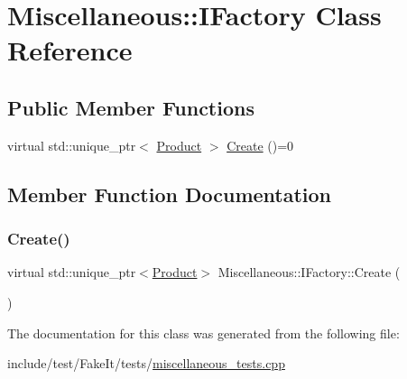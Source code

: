 \hypertarget{classMiscellaneous_1_1IFactory}{}\section{Miscellaneous\+::I\+Factory Class Reference}
\label{classMiscellaneous_1_1IFactory}
\subsection*{Public Member Functions}
\begin{DoxyCompactItemize}
\item 
virtual std\+::unique\+\_\+ptr$<$ \mbox{\hyperlink{classMiscellaneous_1_1Product}{Product}} $>$ \mbox{\hyperlink{classMiscellaneous_1_1IFactory_a6342f5a0e744054e2ca622ed47ee41e3}{Create}} ()=0
\end{DoxyCompactItemize}


\subsection{Member Function Documentation}
\mbox{\label{classMiscellaneous_1_1IFactory_a6342f5a0e744054e2ca622ed47ee41e3}} 
\subsubsection{\texorpdfstring{Create()}{Create()}}
{\footnotesize\ttfamily virtual std\+::unique\+\_\+ptr$<$\mbox{\hyperlink{classMiscellaneous_1_1Product}{Product}}$>$ Miscellaneous\+::\+I\+Factory\+::\+Create (\begin{DoxyParamCaption}{ }\end{DoxyParamCaption})\hspace{0.3cm}{\ttfamily [pure virtual]}}



The documentation for this class was generated from the following file\+:\begin{DoxyCompactItemize}
\item 
include/test/\+Fake\+It/tests/\mbox{\hyperlink{miscellaneous__tests_8cpp}{miscellaneous\+\_\+tests.\+cpp}}\end{DoxyCompactItemize}
